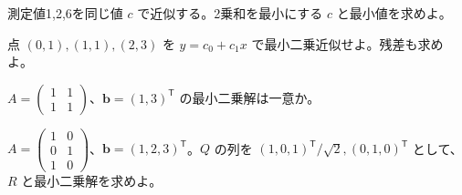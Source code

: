 \documentclass[11pt]{article}
\begin{document}

\problem[定数モデル]
測定値1,2,6を同じ値 $c$ で近似する。2乗和を最小にする $c$ と最小値を求めよ。
\workspace{38mm}

\problem[直線近似]
点 $(0,1),(1,1),(2,3)$ を $y=c_0+c_1x$ で最小二乗近似せよ。残差も求めよ。
\workspace{38mm}
\newpage

\problem[従属する列]
$A=\begin{pmatrix}1&1\\1&1\end{pmatrix}$、$\boldsymbol b=(1,3)^{\mathsf T}$ の最小二乗解は一意か。
\workspace{38mm}

\problem[QRによる解法]
$A=\begin{pmatrix}1&0\\0&1\\1&0\end{pmatrix}$、$\boldsymbol b=(1,2,3)^{\mathsf T}$。$Q$ の列を $(1,0,1)^{\mathsf T}/\sqrt2,(0,1,0)^{\mathsf T}$ として、$R$ と最小二乗解を求めよ。
\workspace{38mm}
\end{document}
